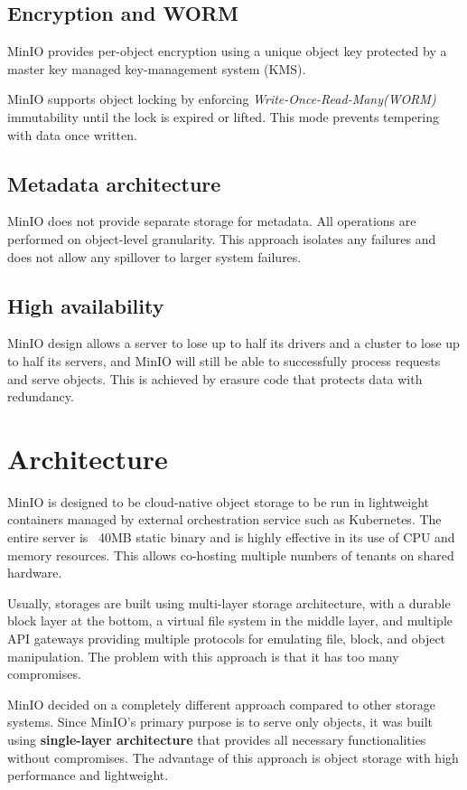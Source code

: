    \subsection*{Encryption and WORM}
    MinIO provides per-object encryption using a unique object key protected by a master key managed key-management system (KMS).

    MinIO supports object locking by enforcing \textit{Write-Once-Read-Many(WORM)} immutability until the lock is expired or lifted. This mode prevents tempering with data once written\cite{minioHighPerformance}.

    \subsection*{Metadata architecture}
    MinIO does not provide separate storage for metadata. All operations are performed on object-level granularity. This approach isolates any failures and does not allow any spillover to larger system failures\cite{minioIntel}.

    \subsection*{High availability}
    MinIO design allows a server to lose up to half its drivers and a cluster to lose up to half its servers, and MinIO will still be able to successfully process requests and serve objects. This is achieved by erasure code that protects data with redundancy\cite{minioIntel}.

    \section{Architecture}
    MinIO is designed to be cloud-native object storage to be run in lightweight containers managed by external orchestration service such as Kubernetes. The entire server is ~40MB static binary and is highly effective in its use of CPU and memory resources. This allows co-hosting multiple numbers of tenants on shared hardware\cite{minioObjectStorage}.

    Usually, storages are built using multi-layer storage architecture, with a durable block layer at the bottom, a virtual file system in the middle layer, and multiple API gateways providing multiple protocols for emulating file, block, and object manipulation. The problem with this approach is that it has too many compromises\cite{minioIntel}.

    MinIO decided on a completely different approach compared to other storage systems. Since MinIO's primary purpose is to serve only objects, it was built using \textbf{single-layer architecture} that provides all necessary functionalities without compromises. The advantage of this approach is object storage with high performance and lightweight\cite{minioIntel}.

